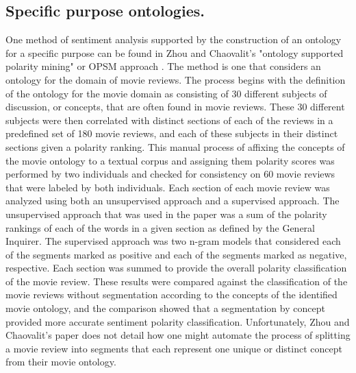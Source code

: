 \documentclass[letterpaper, 10 pt, conference]{ieeeconf}
\begin{document}
\subsection{Specific purpose ontologies.}
One method of sentiment analysis supported by the construction of an ontology for a specific purpose can be found in Zhou and Chaovalit's "ontology supported polarity mining" or OPSM approach \textcolor{gray}{\cite{Zhou}}. The method is one that considers an ontology for the domain of movie reviews. The process begins with the definition of the ontology for the movie domain as consisting of 30 different subjects of discussion, or concepts, that are often found in movie reviews. These 30 different subjects were then correlated with distinct sections of each of the reviews in a predefined set of 180 movie reviews, and each of these subjects in their distinct sections given a polarity ranking. This manual process of affixing the concepts of the movie ontology to a textual corpus and assigning them polarity scores was performed by two individuals and checked for consistency on 60 movie reviews that were labeled by both individuals. Each section of each movie review was analyzed using both an unsupervised approach and a supervised approach. The unsupervised approach that was used in the paper was a sum of the polarity rankings of each of the words in a given section as defined by the General Inquirer. The supervised approach was two n-gram models that considered each of the segments marked as positive and each of the segments marked as negative, respective. Each section was summed to provide the overall polarity classification of the movie review. These results were compared against the classification of the movie reviews without segmentation according to the concepts of the identified movie ontology, and the comparison showed that a segmentation by concept provided more accurate sentiment polarity classification. Unfortunately, Zhou and Chaovalit's paper does not detail how one might automate the process of splitting a movie review into segments that each represent one unique or distinct concept from their movie ontology.
\end{document}
